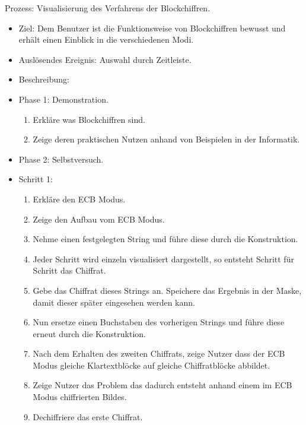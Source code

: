 \documentclass{article}
\begin{document}
\begin{FA}[start=700]
 \item Prozess: Visualisierung des Verfahrens der Blockchiffren.
\end{FA}
\begin{itemize}[label={}]

 \item Ziel: Dem Benutzer ist die Funktionsweise von Blockchiffren bewusst und erhält einen Einblick in die verschiedenen Modi.

 \item Auslösendes Ereignis: Auswahl durch Zeitleiste.

 \item Beschreibung:

 \item Phase 1: Demonstration.

	\begin{enumerate}[]
	 \item Erkläre was Blockchiffren sind.
	 \item Zeige deren praktischen Nutzen anhand von Beispielen in der Informatik.
	\end{enumerate}

 \item Phase 2: Selbstversuch.

 \item Schritt 1:

	\begin{enumerate}
	 \item Erkläre den \gls{ECB} Modus.
	 \item Zeige den Aufbau vom \gls{ECB} Modus.
	 \item Nehme einen festgelegten String und führe diese durch die Konstruktion.
	 \item Jeder Schritt wird einzeln visualisiert dargestellt, so entsteht Schritt für Schritt das Chiffrat.
	 \item Gebe das Chiffrat dieses Strings an. Speichere das Ergebnis in der Maske, damit dieser später eingesehen werden kann.
	 \item Nun ersetze einen Buchstaben des vorherigen Strings und führe diese erneut durch die Konstruktion.
	 \item Nach dem Erhalten des zweiten Chiffrats, zeige Nutzer dass der ECB Modus gleiche Klartextblöcke auf gleiche Chiffratblöcke abbildet.
	 \item Zeige Nutzer das Problem das dadurch entsteht anhand einem im \gls{ECB} Modus chiffrierten Bildes.
	 \item Dechiffriere das erste Chiffrat.
	\end{enumerate}


\end{itemize}
\end{document}
